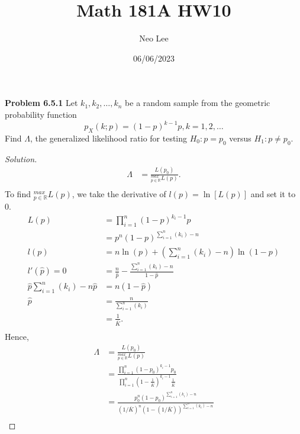 \documentclass{article}
\title{Math 181A HW10}
\author{Neo Lee}
\date{06/06/2023}
\begin{document}
 

\maketitle 

\textbf{Problem 6.5.1}
Let $k_1, k_2, \dots, k_n$ be a random sample from the geometric probability function
$$p_X(k;p)=(1-p)^{k-1}p, k=1,2,\dots$$
Find $\Lambda$, the generalized likelihood ratio for testing $H_0: p = p_0$ versus $H_1: p  \neq p_0$.
\begin{proof}[Solution]
    \begin{align*}
        \Lambda & = \frac{L(p_0)}{^{max}_{p \in \mathbb{R}}L(p)}. \\
    \end{align*}
    To find $^{max}_{p\in\mathbb{R}}L(p)$, we take the derivative of $l(p) = \ln[L(p)]$ and set it to 0.
    \begin{align*}
        L(p) & = \prod_{i=1}^{n}(1-p)^{k_i-1}p \\
        & = p^n(1-p)^{\sum\limits_{i=1}^{n}(k_i)-n} \\
        l(p) & = n\ln(p) + \left(\sum\limits_{i=1}^{n}(k_i)-n\right)\ln(1-p) \\
        l'(\hat{p}) = 0 & = \frac{n}{\hat{p}} - \frac{\sum\limits_{i=1}^{n}(k_i)-n}{1-\hat{p}} \\
        \hat{p}\sum_{i=1}^{n}(k_i) - n\hat{p} & = n(1-\hat{p}) \\
        \hat{p} & = \frac{n}{\sum_{i=1}^{n}(k_i)} \\
        & = \frac{1}{\overline{K}}. \\
    \end{align*}
    Hence,
    \begin{align*}
        \Lambda & = \frac{L(p_0)}{^{max}_{p \in \mathbb{R}}L(p)} \\
        & = \frac{\prod\limits_{i=1}^{n}(1-p_0)^{k_i-1}p_0}{\prod\limits_{i=1}^{n}(1-\frac{1}{\overline{K}})^{k_i-1}\frac{1}{\overline{K}}} \\
        & = \frac{p_0^n(1-p_0)^{\sum_{i=1}^{n}(k_i)-n}}{(1/\overline{K})^n(1-(1/\overline{K}))^{\sum_{i=1}^{n}(k_i)-n}} \\
    \end{align*}
\end{proof}
\bigbreak
\end{document}
